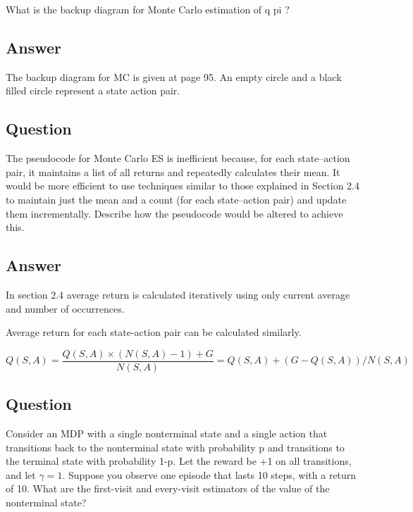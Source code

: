 \documentclass[11pt]{article}
\begin{document}
    What is the backup diagram for Monte Carlo estimation of q pi ?

    \subsection*{Answer}

    The backup diagram for MC is given at page 95.
    An empty circle and a black filled circle represent a state action pair.

    \subsection{Question}

    The pseudocode for Monte Carlo ES is inefficient because, for each state–action pair, it maintains a list of all returns and repeatedly calculates their mean.
    It would be more efficient to use techniques similar to those explained in Section 2.4 to maintain just the mean and a count (for each state–action pair) and update them incrementally.
    Describe how the pseudocode would be altered to achieve this.

    \subsection*{Answer}

    In section 2.4 average return is calculated iteratively using only current average and number of occurrences.

    Average return for each state-action pair can be calculated similarly.

    \begin{equation}
        Q(S,A) = \frac{Q(S,A) \times (N(S,A)-1) + G}{N(S,A)} = Q(S,A) + (G - Q(S,A)) / N(S,A)
    \end{equation}

    \subsection{Question}

    Consider an MDP with a single nonterminal state and a single action that transitions back to the nonterminal state with probability p and transitions to the terminal state with probability 1-p.
    Let the reward be +1 on all transitions, and let $\gamma=1$.
    Suppose you observe one episode that lasts 10 steps, with a return of 10.
    What are the first-visit and every-visit estimators of the value of the nonterminal state?
\end{document}
